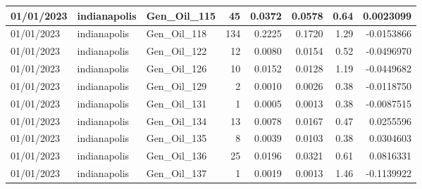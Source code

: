 \documentclass[
  letterpaper,
  DIV=11,
  numbers=noendperiod]{scrartcl}
\begin{document}
\begin{tabular}{l|l|l|r|r|r|r|r}
\hline
01/01/2023 & indianapolis & Gen\_Oil\_115 & 45 & 0.0372 & 0.0578 & 0.64 & 0.0023099\\
\hline
01/01/2023 & indianapolis & Gen\_Oil\_118 & 134 & 0.2225 & 0.1720 & 1.29 & -0.0153866\\
\hline
01/01/2023 & indianapolis & Gen\_Oil\_122 & 12 & 0.0080 & 0.0154 & 0.52 & -0.0496970\\
\hline
01/01/2023 & indianapolis & Gen\_Oil\_126 & 10 & 0.0152 & 0.0128 & 1.19 & -0.0449682\\
\hline
01/01/2023 & indianapolis & Gen\_Oil\_129 & 2 & 0.0010 & 0.0026 & 0.38 & -0.0118750\\
\hline
01/01/2023 & indianapolis & Gen\_Oil\_131 & 1 & 0.0005 & 0.0013 & 0.38 & -0.0087515\\
\hline
01/01/2023 & indianapolis & Gen\_Oil\_134 & 13 & 0.0078 & 0.0167 & 0.47 & 0.0255596\\
\hline
01/01/2023 & indianapolis & Gen\_Oil\_135 & 8 & 0.0039 & 0.0103 & 0.38 & 0.0304603\\
\hline
01/01/2023 & indianapolis & Gen\_Oil\_136 & 25 & 0.0196 & 0.0321 & 0.61 & 0.0816331\\
\hline
01/01/2023 & indianapolis & Gen\_Oil\_137 & 1 & 0.0019 & 0.0013 & 1.46 & -0.1139922\\
\hline
\end{tabular}
\end{document}

